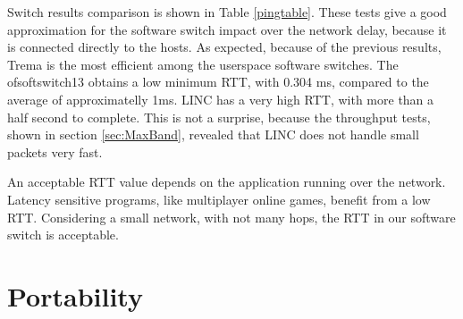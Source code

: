     Switch results comparison is shown in Table \ref{pingtable}. These tests give a good approximation for the software switch impact over the network delay, because it is connected directly to the hosts. As expected, because of the previous results, Trema is the most efficient among the userspace software switches. The ofsoftswitch13 obtains a low minimum RTT, with 0.304 ms, compared to the average of approximatelly 1ms. LINC has a very high RTT, with more than a half second to complete. This is not a surprise, because the throughput tests, shown in section \ref{sec:MaxBand}, revealed that LINC does not handle small packets very fast.   
    
    An acceptable RTT value depends on the application running over the network. Latency sensitive programs, like multiplayer online games, benefit from a low RTT. Considering a small network, with not many hops, the RTT in our software switch is acceptable.   

    \begin{table}[H]
    \caption{Ping Round Trip Time comparison between software switches}
    \label{pingtable}
    \end{table}

\section{Portability}


